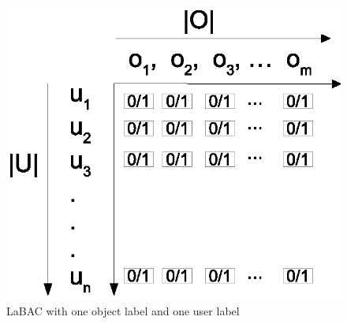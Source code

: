 	\begin{figure} 
		\centering
		\includegraphics[width=.4\textwidth]{policyspace-hru}
		\caption{LaBAC with one object label and one user label}
		\label{fig:policyspace-hru}
	\end{figure}